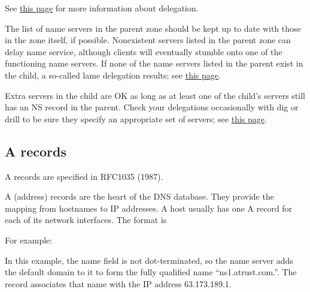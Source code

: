 \leavevmode\hypertarget{part0024_split_023.htmlux5cux23_idContainer940}{}%
See
\protect\hyperlink{part0024_split_015.htmlux5cux23_idTextAnchor859}{this
page} for more information about delegation.

The list of name servers in the parent zone should be kept up to date
with those in the zone itself, if possible. Nonexistent servers listed
in the parent zone can delay name service, although clients will
eventually stumble onto one of the functioning name servers. If none of
the name servers listed in the parent exist in the child, a so-called
lame delegation results; see
\protect\hyperlink{part0024_split_072.htmlux5cux23_idTextAnchor966}{this
page}.

Extra servers in the child are OK as long as at least one of the child's
servers still has an NS record in the parent. Check your delegations
occasionally with {dig} or {drill} to be sure they specify an
appropriate set of servers; see
\protect\hyperlink{part0024_split_018.htmlux5cux23_idTextAnchor863}{this
page}.

\protect\hypertarget{part0024_split_024.html}{}{}

\hypertarget{part0024_split_024.htmlux5cux23_idContainer1069}{}
\hypertarget{part0024_split_024.htmlux5cux23calibre_pb_23}{%
\subsection[A
records]{\texorpdfstring{\protect\hypertarget{part0024_split_024.htmlux5cux23_idTextAnchor875}{}{}\protect\hypertarget{part0024_split_024.htmlux5cux23_idIndexMarker2072}{}{}\protect\hypertarget{part0024_split_024.htmlux5cux23_idIndexMarker2073}{}{}A
records}{A records}}\label{part0024_split_024.htmlux5cux23calibre_pb_23}}

\leavevmode\hypertarget{part0024_split_024.htmlux5cux23_idContainer941}{}%
A records are specified in RFC1035 (1987).

\protect\hypertarget{part0024_split_024.htmlux5cux23_idIndexMarker2074}{}{}A
(address) records are the heart of the DNS database. They provide the
mapping from hostnames to IP addresses. A host usually has one A record
for each of its network interfaces. The format is


For example:


In this example, the {name} field is not dot-terminated, so the name
server adds the default domain to it to form the fully qualified name
``ns1.atrust.com.''. The record associates that name with the IP address
63.173.189.1.

